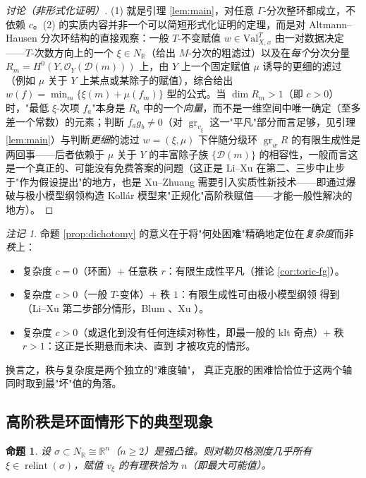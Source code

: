 \documentclass[11pt,a4paper]{article}
\newtheorem{proposition}[theorem]{命题}
\theoremstyle{definition}
\theoremstyle{remark}
\newtheorem{remark}[theorem]{注记}
\DeclareMathOperator{\gr}{gr}
\DeclareMathOperator{\relint}{relint}
\newcommand{\R}{\mathbb{R}}
\begin{document}
\begin{proof}[讨论（非形式化证明）]
(1) 就是引理 \ref{lem:main}，对任意 $\Gamma$-分次整环都成立，不依赖 $c$。(2) 的实质内容并非一个可以简短形式化证明的定理，而是对 Altmann--Hausen 分次环结构的直接观察：一般 $T$-不变赋值 $w\in \mathrm{Val}_{X,x}^T$ 由一对数据决定——$T$-次数方向上的一个 $\xi\in N_\R$（给出 $M$-分次的粗滤过）以及在\emph{每个}分次分量 $R_m=H^0(Y,\mathcal O_Y(\mathcal D(m)))$ 上，由 $Y$ 上一个固定赋值 $\mu$ 诱导的更细的滤过（例如 $\mu$ 关于 $Y$ 上某点或某除子的赋值），综合给出 $w(f)=\min_m\{\xi(m)+\mu(f_m)\}$ 型的公式。当 $\dim R_m>1$（即 $c>0$）时，"最低 $\xi$-次项 $f_a$"本身是 $R_a$ 中的一个\emph{向量}，而不是一维空间中唯一确定（至多差一个常数）的元素；判断 $f_a g_b\ne 0$（对 $\gr_{v_\xi}$ 这一"平凡"部分而言足够，见引理 \ref{lem:main}）与判断\emph{更细}的滤过 $w=(\xi,\mu)$ 下伴随分级环 $\gr_w R$ 的有限生成性是两回事——后者依赖于 $\mu$ 关于 $Y$ 的丰富除子族 $\{\mathcal D(m)\}$ 的相容性，一般而言这是一个真正的、可能没有免费答案的问题（这正是 Li--Xu \cite{LX2018} 在第二、三步中止步于"作为假设提出"的地方，也是 Xu--Zhuang \cite{XZ2025} 需要引入实质性新技术——即通过爆破与极小模型纲领构造 Kollár 模型来"正规化"高阶秩赋值——才能一般性解决的地方）。
\end{proof}

\begin{remark}
命题 \ref{prop:dichotomy} 的意义在于将"何处困难"精确地定位在\emph{复杂度}而非\emph{秩}上：
\begin{itemize}[leftmargin=1.6em]
  \item 复杂度 $c=0$（环面）+ 任意秩 $r$：有限生成性平凡（推论 \ref{cor:toric-fg}）。
  \item 复杂度 $c>0$（一般 $T$-变体）+ 秩 $1$：有限生成性可由极小模型纲领 \cite{BCHM2010} 得到（Li--Xu 第二步部分情形，Blum \cite{Blum2018}、Xu \cite{Xu2020}）。
  \item 复杂度 $c>0$（或退化到没有任何连续对称性，即最一般的 klt 奇点）+ 秩 $r>1$：这正是长期悬而未决、直到 \cite{XZ2025} 才被攻克的情形。
\end{itemize}
换言之，秩与复杂度是两个独立的"难度轴"，\cite{XZ2025} 真正克服的困难恰恰位于这两个轴同时取到最"坏"值的角落。
\end{remark}

\subsection{高阶秩是环面情形下的典型现象}

\begin{proposition}\label{prop:generic}
设 $\sigma\subset N_\R\cong\R^n$（$n\ge2$）是强凸锥。则对勒贝格测度几乎所有 $\xi\in\relint(\sigma)$，赋值 $v_\xi$ 的有理秩恰为 $n$（即最大可能值）。
\end{proposition}
\end{document}
